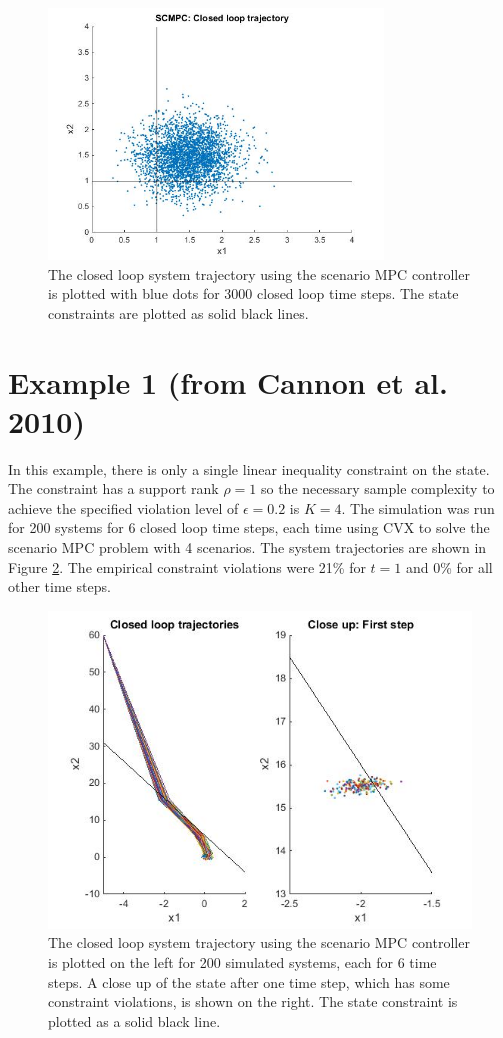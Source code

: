 \documentclass[12 pt]{report}
\begin{document}
\begin{figure}
	\centering
	\includegraphics[width=3.5in]{SCMPC_3000.jpg}
	\caption{The closed loop system trajectory using the scenario MPC controller is plotted with blue dots for 3000 closed loop time steps. The state constraints are plotted as solid black lines.}
	\label{fig:SCMPC_3000}
\end{figure}


\section{Example 1 (from Cannon et al. 2010)}

In this example, there is only a single linear inequality constraint on the state. The constraint has a support rank $\rho = 1$ so the necessary sample complexity to achieve the specified violation level of $\epsilon = 0.2$ is $K = 4$. The simulation was run for 200 systems for 6 closed loop time steps, each time using CVX to solve the scenario MPC problem with 4 scenarios. The system trajectories are shown in Figure \ref{fig:SCMPC_200x6}. The empirical constraint violations were 21\% for $t = 1$ and 0\% for all other time steps.

\begin{figure}
	\includegraphics[width=\linewidth]{SCMPC_200x6.jpg}
	\caption{The closed loop system trajectory using the scenario MPC controller is plotted on the left for 200 simulated systems, each for 6 time steps. A close up of the state after one time step, which has some constraint violations, is shown on the right. The state constraint is plotted as a solid black line.}
	\label{fig:SCMPC_200x6}
\end{figure}
\end{document}
